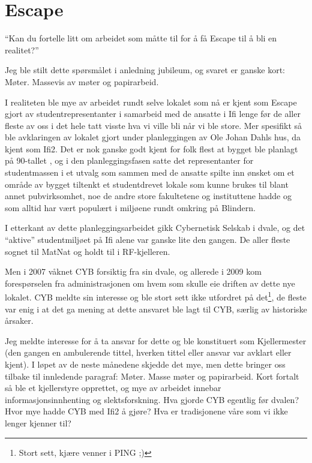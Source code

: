 \chapter{Escape}
\label{chap:escape}

\author{Skrevet av Magnus Johansen}

``Kan du fortelle litt om arbeidet som måtte til for å få Escape til å bli en realitet?''

Jeg ble stilt dette spørsmålet i anledning jubileum, og svaret er ganske kort: Møter. Massevis av møter og papirarbeid.

I realiteten ble mye av arbeidet rundt selve lokalet som nå er kjent som Escape gjort av studentrepresentanter i samarbeid med de ansatte i Ifi lenge før de aller fleste av oss i det hele tatt visste hva vi ville bli når vi ble store. Mer spesifikt så ble avklaringen av lokalet gjort under planleggingen av Ole Johan Dahls hus, da kjent som Ifi2. Det er nok ganske godt kjent for folk flest at bygget ble planlagt på 90-tallet , og i den planleggingsfasen satte det representanter for studentmassen i et utvalg som sammen med de ansatte spilte inn ønsket om et område av bygget tiltenkt et studentdrevet lokale som kunne brukes til blant annet pubvirksomhet, noe de andre store fakultetene og instituttene hadde og som alltid har vært populært i miljøene rundt omkring på Blindern.

I etterkant av dette planleggingsarbeidet gikk Cybernetisk Selskab i dvale, og det ``aktive'' studentmiljøet på Ifi alene var ganske lite den gangen. De aller fleste sognet til MatNat og holdt til i RF-kjelleren. 

Men i 2007 våknet CYB forsiktig fra sin dvale, og allerede i 2009 kom forespørselen fra administrasjonen om hvem som skulle eie driften av dette nye lokalet. CYB meldte sin interesse og ble stort sett ikke utfordret på det\footnote{Stort sett, kjære venner i PING ;)}, de fleste var enig i at det ga mening at dette ansvaret ble lagt til CYB, særlig av historiske årsaker.

Jeg meldte interesse for å ta ansvar for dette og ble konstituert som Kjellermester (den gangen en ambulerende tittel, hverken tittel eller ansvar var avklart eller kjent). I løpet av de neste månedene skjedde det mye, men dette bringer oss tilbake til innledende paragraf: Møter. Masse møter og papirarbeid. Kort fortalt så ble et kjellerstyre opprettet, og mye av arbeidet innebar informasjonsinnhenting og slektsforskning. Hva gjorde CYB egentlig før dvalen? Hvor mye hadde CYB med Ifi2 å gjøre? Hva er tradisjonene våre som vi ikke lenger kjenner til?

